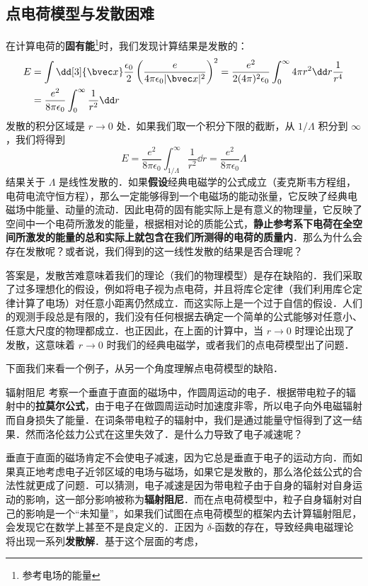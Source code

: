 
\subsection{点电荷模型与发散困难}
在计算电荷的\textbf{固有能}\footnote{参考电场的能量}时，我们发现计算结果是发散的：
\begin{equation}\label{elecdb_eq1}
\begin{aligned}
E&=\int \dd[3]{\bvec x}\frac{\epsilon_0}{2} \left(\frac{e}{4\pi\epsilon_0 |\bvec x|^2}\right)^2=\frac{e^2}{2(4\pi)^2\epsilon_0}\int_0^\infty 4\pi r^2\dd r \frac{1}{r^4}\\
&=\frac{e^2}{8\pi\epsilon_0} \int_0^\infty \frac{1}{r^2}\dd r
\end{aligned}
\end{equation}
发散的积分区域是 $r\rightarrow 0$ 处．如果我们取一个积分下限的截断，从 $1/\Lambda$ 积分到 $\infty$，我们将得到
\begin{equation}
E=\frac{e^2}{8\pi\epsilon_0}\int_{1/\Lambda}^{\infty} \frac{1}{r^2}\dd r=\frac{e^2}{8\pi\epsilon_0}\Lambda
\end{equation}
结果关于 $\Lambda$ 是线性发散的．如果\textbf{假设}经典电磁学的公式成立（麦克斯韦方程组，电荷电流守恒方程），那么一定能够得到一个电磁场的能动张量，它反映了经典电磁场中能量、动量的流动．因此电荷的固有能实际上是有意义的物理量，它反映了空间中一个电荷所激发的能量，根据相对论的质能公式，\textbf{静止参考系下电荷在全空间所激发的能量的总和实际上就包含在我们所测得的电荷的质量内}．那么为什么会存在发散呢？或者说，我们得到的这一线性发散的结果是否合理呢？

答案是，发散苦难意味着我们的理论（我们的物理模型）是存在缺陷的．我们采取了过多理想化的假设，例如将电子视为点电荷，并且将库仑定律（我们利用库仑定律计算了电场）对任意小距离仍然成立．而这实际上是一个过于自信的假设．人们的观测手段总是有限的，我们没有任何根据去确定一个简单的公式能够对任意小、任意大尺度的物理都成立．也正因此，在上面的计算中，当 $r\rightarrow 0$ 时理论出现了发散，这意味着 $r\rightarrow 0$ 时我们的经典电磁学，或者我们的点电荷模型出了问题．

下面我们来看一个例子，从另一个角度理解点电荷模型的缺陷．
\begin{example}{辐射阻尼}
考察一个垂直于直面的磁场中，作圆周运动的电子．根据带电粒子的辐射中的\textbf{拉莫尔公式}，由于电子在做圆周运动时加速度非零，所以电子向外电磁辐射而自身损失了能量．在词条带电粒子的辐射中，我们是通过能量守恒得到了这一结果．然而洛伦兹力公式在这里失效了．是什么力导致了电子减速呢？
\end{example}
垂直于直面的磁场肯定不会使电子减速，因为它总是垂直于电子的运动方向．而如果真正地考虑电子近邻区域的电场与磁场，如果它是发散的，那么洛伦兹公式的合法性就更成了问题．可以猜测，电子减速是因为带电粒子由于自身的辐射对自身运动的影响，这一部分影响被称为\textbf{辐射阻尼}．而在点电荷模型中，粒子自身辐射对自己的影响是一个“未知量”，如果我们试图在点电荷模型的框架内去计算辐射阻尼，会发现它在数学上甚至不是良定义的．正因为 $\delta$-函数的存在，导致经典电磁理论将出现一系列\textbf{发散解}．基于这个层面的考虑，

